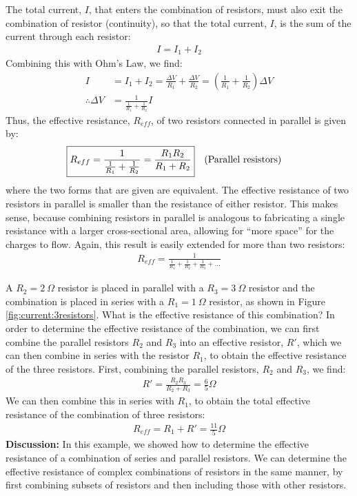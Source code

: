 The total current, $I$, that enters the combination of resistors, must also exit the combination of resistor (continuity), so that the total current, $I$, is the sum of the current through each resistor:
\begin{align*}
I=I_1+I_2
\end{align*}
Combining this with Ohm's Law, we find:
\begin{align*}
I&=I_1+I_2=\frac{\Delta V}{R_1}+\frac{\Delta V}{R_2}=\left( \frac{1}{R_1}+\frac{1}{R_2} \right)\Delta V\\
\therefore \Delta V &= \frac{1}{\frac{1}{R_1}+\frac{1}{R_2}}I
\end{align*}
Thus, the effective resistance, $R_{eff}$, of two resistors connected in parallel is given by:
\begin{align*}
\Aboxed{R_{eff}=\frac{1}{\frac{1}{R_1}+\frac{1}{R_2}}=\frac{R_1R_2}{R_1+R_2}}\quad \text{(Parallel resistors)}
\end{align*}
where the two forms that are given are equivalent. The effective resistance of two resistors in parallel is smaller than the resistance of either resistor. This makes sense, because combining resistors in parallel is analogous to fabricating a single resistance with a larger cross-sectional area, allowing for ``more space'' for the charges to flow. Again, this result is easily extended for more than two resistors:
\begin{align*}
R_{eff}=\frac{1}{\frac{1}{R_1}+\frac{1}{R_2}+\frac{1}{R_3}+\dots}
\end{align*}

\begin{example}{A $R_2=\SI{2}{\Omega}$ resistor is placed in parallel with a $R_3=\SI{3}{\Omega}$ resistor and the combination is placed in series with a $R_1=\SI{1}{\Omega}$ resistor, as shown in Figure \ref{fig:current:3resistors}. What is the effective resistance of this combination?}
In order to determine the effective resistance of the combination, we can first combine the parallel resistors $R_2$ and $R_3$ into an effective resistor, $R'$, which we can then combine in series with the resistor $R_1$, to obtain the effective resistance of the three resistors. First, combining the parallel resistors, $R_2$ and $R_3$, we find:
\begin{align*}
R'=\frac{R_2R_3}{R_2+R_3}=\frac{6}{5}\si{\Omega}
\end{align*}
We can then combine this in series with $R_1$, to obtain the total effective resistance of the combination of three resistors:
\begin{align*}
R_{eff}=R_1+R'=\frac{11}{5}\si{\Omega}
\end{align*}
\textbf{Discussion: }In this example, we showed how to determine the effective resistance of a combination of series and parallel resistors. We can determine the effective resistance of complex combinations of resistors in the same manner, by first combining subsets of resistors and then including those with other resistors.
\end{example}

